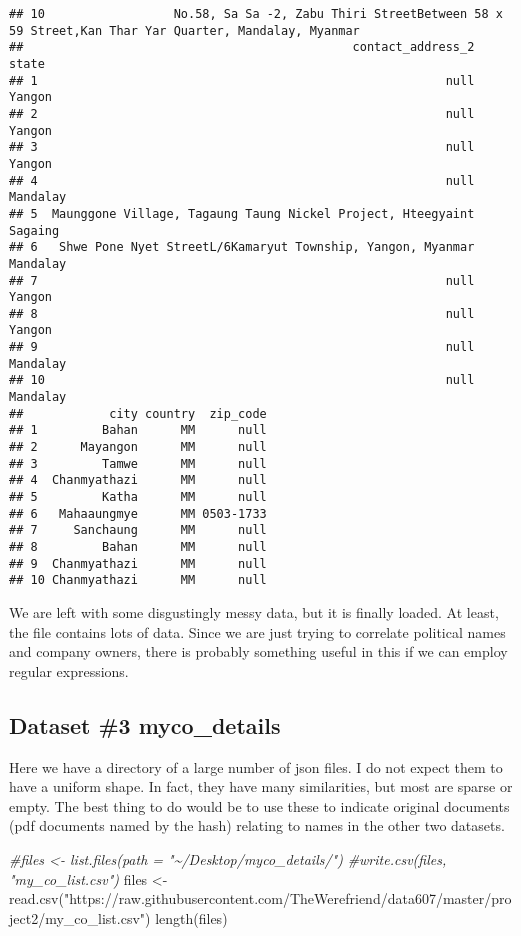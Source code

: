 \documentclass[
]{article}
\newenvironment{Shaded}{\begin{snugshade}}{\end{snugshade}}
\newcommand{\CommentTok}[1]{\textcolor[rgb]{0.56,0.35,0.01}{\textit{#1}}}
\newcommand{\FunctionTok}[1]{\textcolor[rgb]{0.00,0.00,0.00}{#1}}
\newcommand{\NormalTok}[1]{#1}
\newcommand{\OtherTok}[1]{\textcolor[rgb]{0.56,0.35,0.01}{#1}}
\newcommand{\StringTok}[1]{\textcolor[rgb]{0.31,0.60,0.02}{#1}}
\begin{document}
\begin{verbatim}
## 10                  No.58, Sa Sa -2, Zabu Thiri StreetBetween 58 x 59 Street,Kan Thar Yar Quarter, Mandalay, Myanmar
##                                              contact_address_2    state
## 1                                                         null   Yangon
## 2                                                         null   Yangon
## 3                                                         null   Yangon
## 4                                                         null Mandalay
## 5  Maunggone Village, Tagaung Taung Nickel Project, Hteegyaint  Sagaing
## 6   Shwe Pone Nyet StreetL/6Kamaryut Township, Yangon, Myanmar Mandalay
## 7                                                         null   Yangon
## 8                                                         null   Yangon
## 9                                                         null Mandalay
## 10                                                        null Mandalay
##            city country  zip_code
## 1         Bahan      MM      null
## 2      Mayangon      MM      null
## 3         Tamwe      MM      null
## 4  Chanmyathazi      MM      null
## 5         Katha      MM      null
## 6   Mahaaungmye      MM 0503-1733
## 7     Sanchaung      MM      null
## 8         Bahan      MM      null
## 9  Chanmyathazi      MM      null
## 10 Chanmyathazi      MM      null
\end{verbatim}

We are left with some disgustingly messy data, but it is finally loaded.
At least, the file contains lots of data. Since we are just trying to
correlate political names and company owners, there is probably
something useful in this if we can employ regular expressions.

\hypertarget{dataset-3-myco_details}{%
\subsection{Dataset \#3 myco\_details}\label{dataset-3-myco_details}}

Here we have a directory of a large number of json files. I do not
expect them to have a uniform shape. In fact, they have many
similarities, but most are sparse or empty. The best thing to do would
be to use these to indicate original documents (pdf documents named by
the hash) relating to names in the other two datasets.

\begin{Shaded}
\begin{Highlighting}[]
\CommentTok{\#files \textless{}{-} list.files(path = "\textasciitilde{}/Desktop/myco\_details/")}
\CommentTok{\#write.csv(files, "my\_co\_list.csv")}
\NormalTok{files }\OtherTok{\textless{}{-}} \FunctionTok{read.csv}\NormalTok{(}\StringTok{"https://raw.githubusercontent.com/TheWerefriend/data607/master/project2/my\_co\_list.csv"}\NormalTok{)}
\FunctionTok{length}\NormalTok{(files)}
\end{Highlighting}
\end{Shaded}
\end{document}
